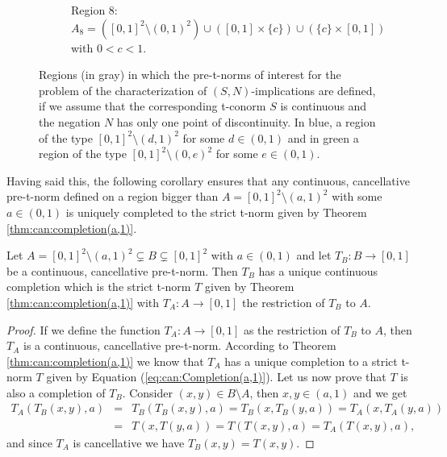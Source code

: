\begin{figure}[t!]
\begin{subfigure}{.2\textwidth}
		\caption*{Region 8:\\
			$A_8=([0,1]^2 \setminus (0,1)^2) \cup ([0,1] \times \{c\}) \cup (\{c\} \times [0,1])$ with $0<c<1$.\\
			\hspace{0.5cm}}
	\end{subfigure}
	\caption{Regions (in gray) in which the pre-t-norms of interest for the problem of the characterization of $(S,N)$-implications are defined, if we assume that the corresponding t-conorm $S$ is continuous and the negation $N$ has only one point of discontinuity. In blue, a region of the type $[0,1]^2 \setminus (d,1)^2$ for some $d \in (0,1)$ and in green a region of the type $[0,1]^2 \setminus (0,e)^2$ for some $e \in (0,1)$.}
	\label{fig:regions:blue}
\end{figure}

Having said this, the following corollary ensures that any continuous, cancellative pre-t-norm defined on a region bigger than $A=[0,1]^2 \setminus (a,1)^2$ with some $a \in (0,1)$ is uniquely completed to the strict t-norm given by Theorem \ref{thm:can:completion(a,1)}.

\begin{corollary}\label{cor:strictcompletion1} Let $A=[0,1]^2 \setminus (a,1)^2 \subsetneq B \subsetneq [0,1]^2$ with $a \in (0,1)$ and let $T_B : B \to [0,1]$ be a continuous, cancellative pre-t-norm. Then $T_B$ has a unique continuous completion which is the strict t-norm $T$ given by Theorem \ref{thm:can:completion(a,1)} with $T_A: A \to [0,1]$ the restriction of $T_B$ to $A$.
\end{corollary}
\begin{proof}
	If we define the function $T_A :A \to [0,1]$ as the restriction of $T_B$ to $A$, then $T_A$ is a continuous, cancellative pre-t-norm. According to Theorem \ref{thm:can:completion(a,1)} we know that $T_A$ has a unique completion to a strict t-norm $T$ given by Equation (\ref{eq:can:Completion(a,1)}). Let us now prove that $T$ is also a completion of $T_B$. Consider $(x,y) \in B \setminus A$, then $x,y \in (a,1)$ and we get
	\begin{eqnarray*}
		T_A(T_B(x,y),a) &=& T_B(T_B(x,y),a) =T_B(x,T_B(y,a)) = T_A(x,T_A(y,a)) \\
		&=& T(x,T(y,a)) =T(T(x,y),a)=T_A(T(x,y),a),
	\end{eqnarray*}
	and since $T_A$ is cancellative we have $T_B(x,y)=T(x,y)$.
\end{proof}


